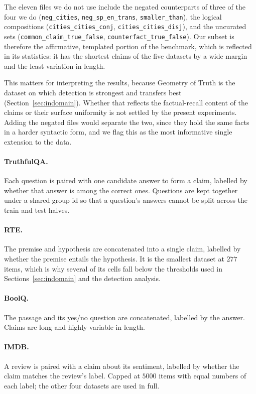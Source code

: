 The eleven files we do not use include the negated counterparts of three of the
four we do (\texttt{neg\_cities}, \texttt{neg\_sp\_en\_trans},
\texttt{smaller\_than}), the logical compositions
(\texttt{cities\_cities\_conj}, \texttt{cities\_cities\_disj}), and the
uncurated sets (\texttt{common\_claim\_true\_false},
\texttt{counterfact\_true\_false}). Our subset is therefore the affirmative,
templated portion of the benchmark, which is reflected in its statistics: it has
the shortest claims of the five datasets by a wide margin and the least
variation in length.

This matters for interpreting the results, because Geometry of Truth is the
dataset on which detection is strongest and transfers best
(Section~\ref{sec:indomain}). Whether that reflects the factual-recall content
of the claims or their surface uniformity is not settled by the present
experiments. Adding the negated files would separate the two, since they hold
the same facts in a harder syntactic form, and we flag this as the most
informative single extension to the data.

\paragraph{TruthfulQA.}
Each question is paired with one candidate answer to form a claim, labelled by
whether that answer is among the correct ones. Questions are kept together under
a shared group id so that a question's answers cannot be split across the train
and test halves.

\paragraph{RTE.}
The premise and hypothesis are concatenated into a single claim, labelled by
whether the premise entails the hypothesis. It is the smallest dataset at $277$
items, which is why several of its cells fall below the thresholds used in
Sections~\ref{sec:indomain} and the detection analysis.

\paragraph{BoolQ.}
The passage and its yes/no question are concatenated, labelled by the answer.
Claims are long and highly variable in length.

\paragraph{IMDB.}
A review is paired with a claim about its sentiment, labelled by whether the
claim matches the review's label. Capped at $5000$ items with equal numbers of
each label; the other four datasets are used in full.

